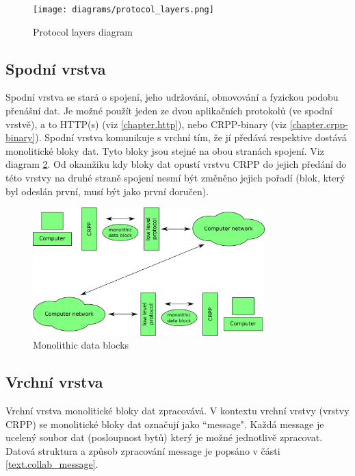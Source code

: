 \documentclass[12pt,oneside,a4paper]{report}
\begin{document}
\begin{figure}[h]
  \centering
  \texttt{[image: diagrams/protocol\_layers.png]}
  \caption{Protocol layers diagram}
  \label{picture.protocol_layers}
\end{figure}

\subsection{Spodní vrstva}

Spodní vrstva se stará o spojení, jeho udržování, obnovování a fyzickou podobu přenášní dat. Je možné použít jeden ze dvou aplikačních protokolů (ve spodní vrstvě), a to HTTP(s) (viz \ref{chapter.http}), nebo CRPP-binary (viz \ref{chapter.crpp-binary}). Spodní vrstva komunikuje s vrchní tím, že jí předává respektive dostává monolitické bloky dat. Tyto bloky jsou stejné na obou stranách spojení. Viz diagram \ref{picture.monolithic_data_blocks}. Od okamžiku kdy bloky dat opustí vrstvu CRPP do jejich předání do této vrstvy na druhé straně spojení nesmí být změněno jejich pořadí (blok, který byl odeslán první, musí být jako první doručen).

\begin{figure}[h]
  \centering
  \includegraphics[width=0.80\textwidth]{diagrams/monolithic_data_blocks.png}
  \caption{Monolithic data blocks}
  \label{picture.monolithic_data_blocks}
\end{figure}

\subsection{Vrchní vrstva}

Vrchní vrstva monolitické bloky dat zpracovává. V kontextu vrchní vrstvy (vrstvy CRPP) se monolitické bloky dat označují jako ``message". Každá message je ucelený soubor dat (posloupnost bytů) který je možné jednotlivě zpracovat. Datová struktura a způsob zpracování message je popsáno v části \ref{text.collab_message}.
\end{document}
